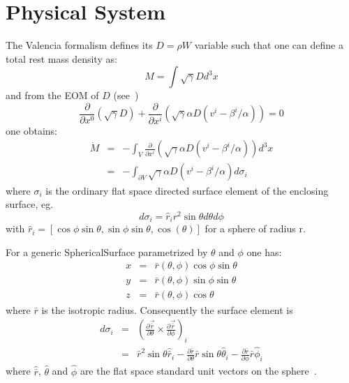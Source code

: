 \section{Physical System}
The Valencia formalism defines its $D = \rho W$ variable such that one can define a 
total rest mass density as:
\begin{displaymath}
    M = \int \sqrt{\gamma} D d^3x
\end{displaymath}
and from the EOM of $D$ (see~\cite{lrr-font})
\begin{displaymath}
    \frac{\partial }{\partial x^0} (\sqrt{\gamma}D )+ 
    \frac{\partial }{\partial x^i} (\sqrt{\gamma} \alpha D (v^i-
      \beta^i/\alpha)) = 0
\end{displaymath}
one obtains:
\begin{eqnarray}
\dot M
&=& - \int_V \frac{\partial }{\partial x^i} 
   (\sqrt\gamma \alpha D(v^i - \beta^i/\alpha)) d^3x \\
&=& -\int_{\partial V} \sqrt\gamma \alpha D (v^i-\beta^i/\alpha) d\sigma_i
\end{eqnarray}
where $\sigma_i$ is the ordinary flat space directed surface element of 
the enclosing surface, eg.\
\begin{displaymath}
d\sigma_i = \hat r_i r^2 \sin\theta d\theta d\phi
\end{displaymath}
with $\hat r_i = [\cos\phi\sin\theta, \sin\phi\sin\theta,
\cos(\theta)]$ 
for a sphere of radius r.

For a generic SphericalSurface parametrized by $\theta$ and $\phi$ one has:
\begin{eqnarray}
    x &=& \bar r(\theta, \phi) \cos\phi \sin\theta \\
    y &=& \bar r(\theta, \phi) \sin\phi \sin\theta \\
    z &=& \bar r(\theta, \phi)          \cos\theta
\end{eqnarray}
where $\bar r$ is the isotropic radius.
Consequently the surface element is
\begin{eqnarray}
    d \sigma_i 
    &=& \left( 
        \frac{\partial\vec{\bar r}}{\partial\theta} \times
        \frac{\partial\vec{\bar r}}{\partial\phi}
        \right)_i \\
    &=& \bar r^2 \sin\theta \hat{\bar r}_i 
        - \frac{\partial\bar r}{\partial\theta} \bar r \sin \theta \hat \theta_i
        - \frac{\partial\bar r}{\partial\phi} \bar r \hat \phi_i
\end{eqnarray}
where $\hat{\bar r}$, $\hat \theta$ and $\hat \phi$ are the flat space
standard unit vectors on the sphere~\cite{mtw:73}. 

